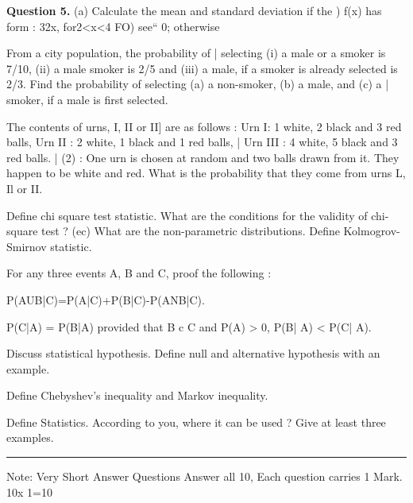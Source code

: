 \documentclass[11pt,a4paper]{article}
\begin{document}
\medskip\noindent\textbf{Question 5.} (a) Calculate the mean and standard deviation if the )
f(x) has form :
32x, for2<x<4
FO) see“
0; otherwise
\begin{parts}
  \item From a city population, the probability of |
  selecting (i) a male or a smoker is 7/10, (ii) a
  male smoker is 2/5 and (iii) a male, if a smoker is
  already selected is 2/3. Find the probability of
  selecting (a) a non-smoker, (b) a male, and (c) a |
  smoker, if a male is first selected.
  \item The contents of urns, I, II or II] are as follows :
  Urn I: 1 white, 2 black and 3 red balls,
  Urn II : 2 white, 1 black and 1 red balls, |
  Urn III : 4 white, 5 black and 3 red balls. |
  (2) :
  One urn is chosen at random and two balls
  drawn from it. They happen to be white and red.
  What is the probability that they come from urns
  L, Il or II.
  \item Define chi square test statistic. What are the
  conditions for the validity of chi-square test ?
  (ec) What are the non-parametric distributions.
  Define Kolmogrov-Smirnov statistic.
  \item For any three events A, B and C, proof the
  following :
  \item P(AUB|C)=P(A|C)+P(B|C)-P(ANB|C).
  \begin{parts}
    \item P(C|A) = P(B|A) provided that B c C and
    P(A) > 0, P(B| A) < P(C| A).
  \end{parts}
  \item Discuss statistical hypothesis. Define null and
  alternative hypothesis with an example.
  \item Define Chebyshev's inequality and Markov
  inequality.
  \item Define Statistics. According to you, where it can
  be used ? Give at least three examples.
\end{parts}

\bigskip{}
\rule{\linewidth}{0.4pt}\smallskip

Note: Very Short Answer Questions Answer all 10, Each
question carries 1 Mark. 10x 1=10
\end{document}

